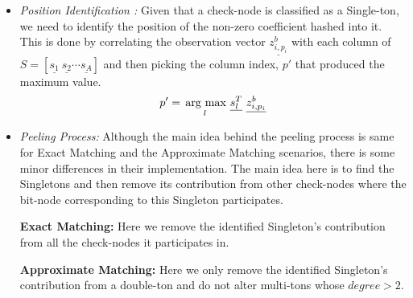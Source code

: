 \begin{enumerate}
\begin{itemize}
			 \item \textit{Position Identification :} Given that a check-node is classified as a Single-ton, we need to identify the position of the non-zero coefficient  hashed into it. This is done by correlating the observation vector $\underline{z^{b}_{i,p_i}}$ with each column of $S = [\underline{s_1} \ \underline{s_2} \cdots \underline{s_A}]$ and then picking the column index, $p'$ that produced the maximum value.
			 \[ p' = \underset{l}{\operatorname*{\,arg\ max}}\  \underline{s^T_l} ~ \underline{z^{b}_{i,p_i}}\]
			 
			 \item \textit{Peeling Process: } Although the main idea behind the peeling process is same for Exact Matching and the Approximate Matching scenarios, there is some minor differences in their implementation. The main idea here is to find the Singletons and then remove its contribution from other check-nodes where the bit-node corresponding to this Singleton participates.
			 
			 
			  {\bf Exact Matching:} Here we remove the identified Singleton's contribution from all the check-nodes it participates in.
			  
			  {\bf Approximate Matching:} Here we only remove the identified Singleton's contribution from a double-ton and do not alter multi-tons whose $degree > 2$.
			  		 
		 \end{itemize} 
	 
	 
\end{enumerate}